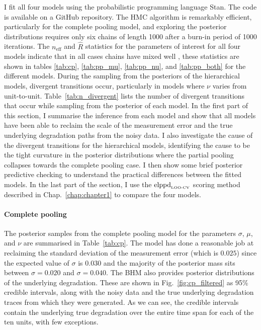 I fit all four models using the probabilistic programming language Stan. The code is available on a GitHub repository. The HMC algorithm is remarkably efficient, particularly for the complete pooling model, and exploring the posterior distributions requires only six chains of length 1000 after a burn-in period of 1000 iterations. The $n_{\mbox{eff}}$ and $\hat{R}$ statistics for the parameters of interest for all four models indicate that in all cases chains have mixed well \citep{Vehtari_2021}, these statistics are shown in tables \ref{tab:cp}, \ref{tab:pp_mu}, \ref{tab:pp_nu}, and \ref{tab:pp_both} for the different models. During the sampling from the posteriors of the hierarchical models, divergent transitions occur, particularly in models where $\nu$ varies from unit-to-unit. Table~\ref{tab:n_divergent} lists the number of divergent transitions that occur while sampling from the posterior of each model. In the first part of this section, I summarise the inference from each model and show that all models have been able to reclaim the scale of the measurement error and the true underlying degradation paths from the noisy data. I also investigate the cause of the divergent transitions for the hierarchical models, identifying the cause to be the tight curvature in the posterior distributions where the partial pooling collapses towards the complete pooling case. I then show some brief posterior predictive checking to understand the practical differences between the fitted models. In the last part of the section, I use the $\hbox{elppd}_{\text{\tiny{LOO-CV}}}$ scoring method described in Chap.~\ref{chap:chapter1} to compare the four models.



\paragraph{Complete pooling} The posterior samples from the complete pooling model for the parameters $\sigma$, $\mu$, and $\nu$ are summarised in Table~\ref{tab:cp}. The model has done a reasonable job at reclaiming the standard deviation of the measurement error (which is $0.025$) since the expected value of $\sigma$ is $0.030$ and the majority of the posterior mass sits between $\sigma = 0.020$ and $\sigma = 0.040$. The BHM also provides posterior distributions of the underlying degradation. These are shown in Fig.~\ref{fig:cp_filtered} as 95\% credible intervals, along with the noisy data and the true underlying degradation traces from which they were generated. As we can see, the credible intervals contain the underlying true degradation over the entire time span for each of the ten units, with few exceptions.

